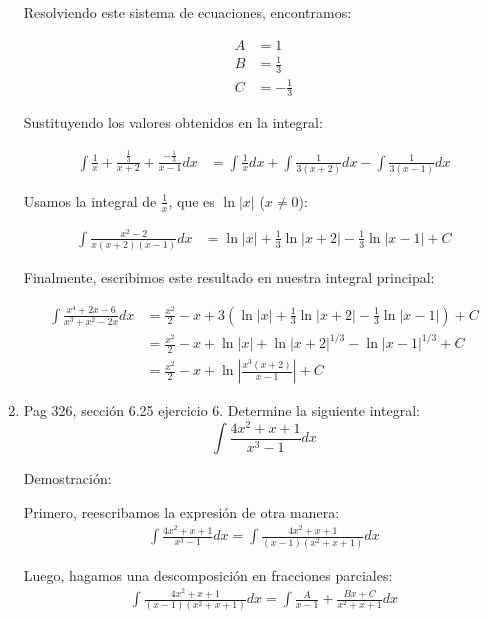 \documentclass{report}
\begin{document}
\begin{enumerate}
        Resolviendo este sistema de ecuaciones, encontramos:
        
        \begin{align*}
        A &= 1 \\
        B &= \frac{1}{3} \\
        C &= -\frac{1}{3}
        \end{align*}
        
        Sustituyendo los valores obtenidos en la integral:
        
        \begin{align*}
        \int{\frac{1}{x}+\frac{\frac{1}{3}}{x+2}+\frac{-\frac{1}{3}}{x-1}dx} &= \int{\frac{1}{x}dx}+\int{\frac{1}{3(x+2)}dx}-\int{\frac{1}{3(x-1)}dx}
        \end{align*}
        
        Usamos la integral de $\frac{1}{x}$, que es $\ln{|x|}$ ($x \neq 0$):
        
        \begin{align*}
        \int{\frac{x^2-2}{x(x+2)(x-1)}dx} &= \ln{|x|}+\frac{1}{3}\ln{|x+2|}-\frac{1}{3}\ln{|x-1|}+C
        \end{align*}
        
        Finalmente, escribimos este resultado en nuestra integral principal:
        
        \begin{align*}
        \int{\frac{x^4+2x-6}{x^3+x^2-2x}dx} &= \frac{x^2}{2}-x+3\left(\ln{|x|}+\frac{1}{3}\ln{|x+2|}-\frac{1}{3}\ln{|x-1|}\right)+C \\
        &=\frac{x^2}{2}-x+\ln{|x|}+\ln{|x+2|}^{1/3}-\ln{|x-1|}^{1/3}+C \\
        &=\frac{x^2}{2}-x+\ln{\left|\frac{x^3(x+2)}{x-1}\right|}+C
        \end{align*}
        
        \item Pag 326, sección 6.25 ejercicio 6. Determine la siguiente integral:
        $$\int \frac{4 x^{2}+x+1}{x^{3}-1} d x$$
        
        Demostración:
        
        Primero, reescribamos la expresión de otra manera:
        \begin{align*}
        \int{\frac{4x^2+x+1}{x^3-1}dx}=\int{\frac{4x^2+x+1}{(x-1)(x^2+x+1)}dx}
        \end{align*}
        
        Luego, hagamos una descomposición en fracciones parciales:
        \begin{align*}
        \int{\frac{4x^2+x+1}{(x-1)(x^2+x+1)}dx}=\int{\frac{A}{x-1}+\frac{Bx+C}{x^2+x+1}dx}
        \end{align*}
        

\end{enumerate}
\end{document}
